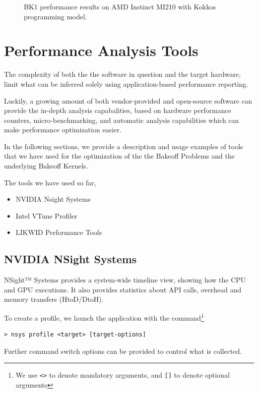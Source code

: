 \documentclass[a4paper,12pt]{article}
\begin{document}
\begin{figure}
\centering
\caption{BK1 performance results on AMD Instinct MI210 with Kokkos programming model.}
\label{fig:BK1_AMD}
\end{figure}

\newpage
\section{{Performance Analysis Tools}}
\label{sec:section3}

The complexity of both the the software in question and the target hardware,
limit what can be inferred solely using application-based performance reporting.

Luckily, a growing amount of both vendor-provided and open-source software can provide the in-depth analysis capabalities, based on hardware performance counters, micro-benchmarking, and automatic analysis capabilities which can make performance optimization easier.

In the following sections, we provide a description and usage examples of
tools that we have used for the optimization of the the Bakeoff Problems and
the underlying Bakeoff Kernels.

The tools we have used so far,
\begin{itemize}
    \item NVIDIA Nsight Systems
    \item Intel VTune Profiler
    \item LIKWID Performance Tools
\end{itemize}


\subsection{{NVIDIA NSight Systems}}

NSight™ Systems provides a system-wide timeline view, showing how the CPU and GPU
executions. It also provides statistics about API calls, overhead and memory transfers
(HtoD/DtoH).

To create a profile, we launch the application with the command\footnote{We use \texttt{<>} to denote mandatory arguments, and \texttt{[]} to denote optional arguments}
\begin{verbatim}
> nsys profile <target> [target-options]
\end{verbatim}
Further command switch options can be provided to control what is collected.
\end{document}
